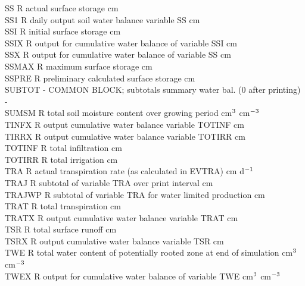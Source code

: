 \documentclass[11pt]{article}
\begin{document}
\begin{tabbing}
SS\> \> R\> actual surface storage\> \> \> \> \> \> \> cm\\
SS1\> \> R\> daily output soil water balance variable SS\> \> \> \> \> \> \> cm\\
SSI\> \> R\> initial surface storage\> \> \> \> \> \> \> cm\\
SSIX\> \> R\> output for cumulative water balance of variable SSI\> \> \> \> \> \> \> cm\\
SSX\> \> R\> output for cumulative water balance of variable SS\> \> \> \> \> \> \> cm\\
SSMAX\> \> R\> maximum surface storage\> \> \> \> \> \> \> cm\\
SSPRE\> \> R \> preliminary calculated surface storage\> \> \> \> \> \> \> cm\\
SUBTOT\> \> -\> COMMON BLOCK; subtotals summary water bal. (0 after printing)\> \> \> \> \> \> \> -\\
SUMSM\> \> R\> total soil moisture content over growing period \> \> \> \> \> \> \> cm$^{{\rm 3}}$ cm$^{{\rm -3}}$\\
TINFX\> \> R\> output cumulative water balance variable TOTINF\> \> \> \> \> \> \> cm\\
TIRRX\> \> R\> output cumulative water balance variable TOTIRR\> \> \> \> \> \> \> cm\\
TOTINF\> \> R\> total infiltration\> \> \> \> \> \> \> cm\\
TOTIRR\> \> R\> total irrigation\> \> \> \> \> \> \> cm\\
TRA\> \> R\> actual transpiration rate (as calculated in EVTRA)\> \> \> \> \> \> \> cm d$^{{\rm -1}}$\\
TRAJ\> \> R\> subtotal of variable TRA over print interval\> \> \> \> \> \> \> cm\\
TRAJWP\> \> R\> subtotal of variable TRA for water limited production\> \> \> \> \> \> \> cm\\
TRAT\> \> R\> total transpiration\> \> \> \> \> \> \> cm\\
TRATX\> \> R\> output cumulative water balance variable TRAT\> \> \> \> \> \> \> cm\\
TSR\> \> R\> total surface runoff\> \> \> \> \> \> \> cm\\
TSRX\> \> R\> output cumulative water balance variable TSR\> \> \> \> \> \> \> cm\\
TWE\> \> R\> total water content of potentially rooted zone at end of simulation\> \> \> \> \> \> \> cm$^{{\rm 3}}$ cm$^{{\rm -3}}$\\
TWEX\> \> R\> output for cumulative water balance of variable TWE\> \> \> \> \> \> \> cm$^{{\rm 3}}$ cm$^{{\rm -3}}$\\

\end{tabbing}
\end{document}
